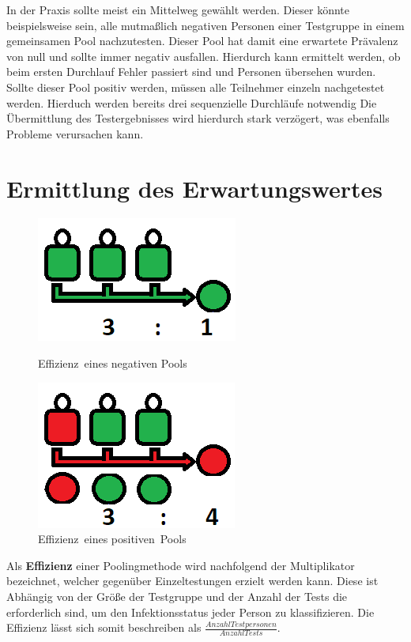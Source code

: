 In der Praxis sollte meist ein Mittelweg gewählt werden.
Dieser könnte beispielsweise sein, alle mutmaßlich negativen Personen einer Testgruppe in einem gemeinsamen Pool nachzutesten.
Dieser Pool hat damit eine erwartete Prävalenz von null und sollte immer negativ ausfallen.
Hierdurch kann ermittelt werden, ob beim ersten Durchlauf Fehler passiert sind und Personen übersehen wurden.
Sollte dieser Pool positiv werden, müssen alle Teilnehmer einzeln nachgetestet werden.
Hierduch werden bereits drei sequenzielle Durchläufe notwendig
Die Übermittlung des Testergebnisses wird hierdurch stark verzögert, was ebenfalls Probleme verursachen kann.

\section{Ermittlung des Erwartungswertes}
\begin{figure}
	\includegraphics[width=.4\textwidth]{img/EffizienzNegativ}
	\caption{\mbox{Effizienz eines} \mbox{negativen} Pools\footnotemark}
	
	\includegraphics[width=.4\textwidth]{img/EffizienzPositiv}
	\caption{\mbox{Effizienz eines} \mbox{positiven Pools}\footnotemark}
\end{figure}

Als \textbf{Effizienz} einer Poolingmethode wird nachfolgend der Multiplikator bezeichnet, welcher gegenüber Einzeltestungen erzielt werden kann.
Diese ist Abhängig von der Größe der Testgruppe und der Anzahl der Tests die erforderlich sind, um den Infektionsstatus jeder Person zu klassifizieren.
Die Effizienz lässt sich somit beschreiben als $\frac{Anzahl Testpersonen}{Anzahl Tests} $.

